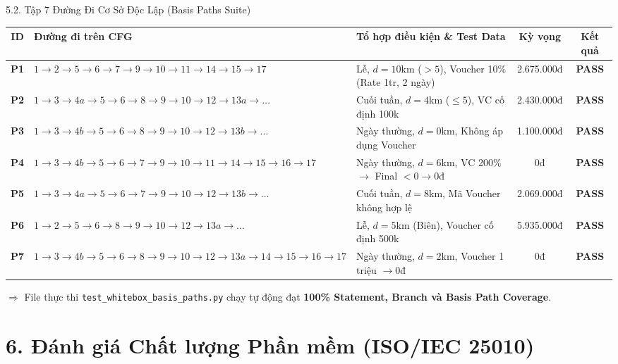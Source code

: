 \documentclass[aspectratio=169,10pt]{beamer}
\begin{document}
\begin{frame}{5.2. Tập 7 Đường Đi Cơ Sở Độc Lập (Basis Paths Suite)}
  \begin{table}[ht]
    \centering\fontsize{6.5pt}{8.5pt}\selectfont
    \begin{tabularx}{\textwidth}{clXcc}
      \toprule
      \textbf{ID} & \textbf{Đường đi trên CFG} & \textbf{Tổ hợp điều kiện \& Test Data} & \textbf{Kỳ vọng} & \textbf{Kết quả} \\
      \midrule
      \textbf{P1} & $1 \to 2 \to 5 \to 6 \to 7 \to 9 \to 10 \to 11 \to 14 \to 15 \to 17$ & Lễ, $d=10$km ($>5$), Voucher 10\% (Rate 1tr, 2 ngày) & 2.675.000đ & \textbf{PASS} \\
      \textbf{P2} & $1 \to 3 \to 4a \to 5 \to 6 \to 8 \to 9 \to 10 \to 12 \to 13a \to \dots$ & Cuối tuần, $d=4$km ($\le 5$), VC cố định 100k & 2.430.000đ & \textbf{PASS} \\
      \textbf{P3} & $1 \to 3 \to 4b \to 5 \to 6 \to 8 \to 9 \to 10 \to 12 \to 13b \to \dots$ & Ngày thường, $d=0$km, Không áp dụng Voucher & 1.100.000đ & \textbf{PASS} \\
      \textbf{P4} & $1 \to 3 \to 4b \to 5 \to 6 \to 7 \to 9 \to 10 \to 11 \to 14 \to 15 \to 16 \to 17$ & Ngày thường, $d=6$km, VC 200\% $\to$ Final $<0 \to 0$đ & 0đ & \textbf{PASS} \\
      \textbf{P5} & $1 \to 3 \to 4a \to 5 \to 6 \to 7 \to 9 \to 10 \to 12 \to 13b \to \dots$ & Cuối tuần, $d=8$km, Mã Voucher không hợp lệ & 2.069.000đ & \textbf{PASS} \\
      \textbf{P6} & $1 \to 2 \to 5 \to 6 \to 8 \to 9 \to 10 \to 12 \to 13a \to \dots$ & Lễ, $d=5$km (Biên), Voucher cố định 500k & 5.935.000đ & \textbf{PASS} \\
      \textbf{P7} & $1 \to 3 \to 4b \to 5 \to 6 \to 8 \to 9 \to 10 \to 12 \to 13a \to 14 \to 15 \to 16 \to 17$ & Ngày thường, $d=2$km, Voucher 1 triệu $\to 0$đ & 0đ & \textbf{PASS} \\
      \bottomrule
    \end{tabularx}
  \end{table}
  \begin{center}
    \footnotesize $\Rightarrow$ File thực thi \texttt{test\_whitebox\_basis\_paths.py} chạy tự động đạt \textbf{100\% Statement, Branch và Basis Path Coverage}.
  \end{center}
\end{frame}

\section{6. Đánh giá Chất lượng Phần mềm (ISO/IEC 25010)}
\end{document}
